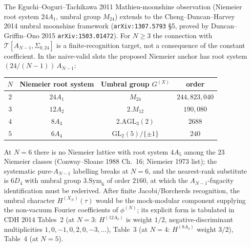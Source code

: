 \begin{remark}
\label{rem:wa-umbral}
The Eguchi--Ooguri--Tachikawa 2011 Mathieu-moonshine observation
(Niemeier root system $24 A_1$, umbral group $M_{24}$) extends to
the Cheng--Duncan--Harvey 2014 umbral moonshine framework
(\texttt{arXiv:1307.5793} \S 5, proved by Duncan--Griffin--Ono 2015
\texttt{arXiv:1503.01472}). For $N\ge 3$ the connection with
$\mathcal T[A_{N-1}, \Sigma_{0,24}]$ is a finite-recognition target,
not a consequence of the constant coefficient. In the naive-valid
slots the proposed Niemeier anchor has root system
$(24/(N-1))\,A_{N-1}$:
\begin{center}
\begin{tabular}{c|ccc}
$N$ & Niemeier root system & Umbral group $G^{(X)}$ & order \\\hline
$2$ & $24 A_1$ & $M_{24}$ & $244{,}823{,}040$ \\
$3$ & $12 A_2$ & $2.M_{12}$ & $190{,}080$ \\
$4$ & $8 A_3$ & $2.\mathrm{AGL}_3(2)$ & $2688$ \\
$5$ & $6 A_4$ & $\mathrm{GL}_2(5)/\{\pm 1\}$ & $240$ \\
\end{tabular}
\end{center}
At $N = 6$ there is no Niemeier lattice with root system $4 A_5$
among the $23$ Niemeier classes (Conway--Sloane 1988 Ch.\ 16;
Niemeier 1973 list); the systematic pure-$A_{N-1}$ labelling
breaks at $N = 6$, and the nearest-rank substitute is $6 D_4$ with
umbral group $3.\mathrm{Sym}_6$ of order $2160$, at which the
$A_{N-1}$-fugacity identification must be rederived. After finite
Jacobi/Borcherds recognition, the umbral character
$H^{(X_N)}(\tau)$ would be the mock-modular component supplying the
non-vacuum Fourier coefficients of $\phi^{(N)}$;
its explicit form is tabulated in CDH 2014 Tables~2 (at $N=3$:
$H^{(12A_2)}$ is weight $1/2$, negative-discriminant multiplicities
$1, 0, -1, 0, 2, 0, -3, \ldots$), Table~3 (at $N=4$: $H^{(8A_3)}$
weight $3/2$), Table~4 (at $N=5$).
\end{remark}

